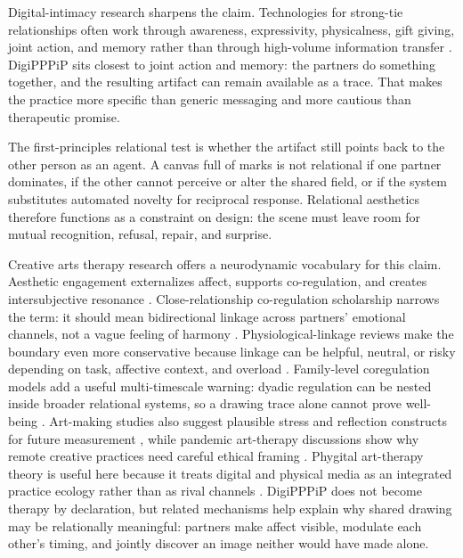 \documentclass[
  english,
]{article}
\begin{document}
Digital-intimacy research sharpens the claim. Technologies for
strong-tie relationships often work through awareness, expressivity,
physicalness, gift giving, joint action, and memory rather than through
high-volume information transfer
\citep{hassenzahl2012love, vetere2005mediating}. DigiPPPiP sits closest
to joint action and memory: the partners do something together, and the
resulting artifact can remain available as a trace. That makes the
practice more specific than generic messaging and more cautious than
therapeutic promise.

The first-principles relational test is whether the artifact still
points back to the other person as an agent. A canvas full of marks is
not relational if one partner dominates, if the other cannot perceive or
alter the shared field, or if the system substitutes automated novelty
for reciprocal response. Relational aesthetics therefore functions as a
constraint on design: the scene must leave room for mutual recognition,
refusal, repair, and surprise.

Creative arts therapy research offers a neurodynamic vocabulary for this
claim. Aesthetic engagement externalizes affect, supports co-regulation,
and creates intersubjective resonance
\citep{vaisvaser2024neurodynamics}. Close-relationship co-regulation
scholarship narrows the term: it should mean bidirectional linkage
across partners' emotional channels, not a vague feeling of harmony
\citep{butler2012coregulation}. Physiological-linkage reviews make the
boundary even more conservative because linkage can be helpful, neutral,
or risky depending on task, affective context, and overload
\citep{timmons2015physiologicallinkage}. Family-level coregulation
models add a useful multi-timescale warning: dyadic regulation can be
nested inside broader relational systems, so a drawing trace alone
cannot prove well-being \citep{paley2022familycoregulation}. Art-making
studies also suggest plausible stress and reflection constructs for
future measurement \citep{kaimal2016cortisol}, while pandemic
art-therapy discussions show why remote creative practices need careful
ethical framing \citep{potash2020pandemics}. Phygital art-therapy theory
is useful here because it treats digital and physical media as an
integrated practice ecology rather than as rival channels
\citep{yoon2025phygital}. DigiPPPiP does not become therapy by
declaration, but related mechanisms help explain why shared drawing may
be relationally meaningful: partners make affect visible, modulate each
other's timing, and jointly discover an image neither would have made
alone.
\end{document}
